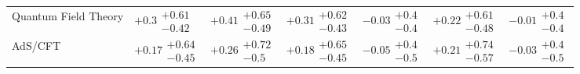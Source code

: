 \begin{table}[H]
\begin{tabular}{lllllll}
Quantum Field Theory                      &        $+0.3\substack{+0.61 \\ -0.42}$ &       $+0.41\substack{+0.65 \\ -0.49}$ &       $+0.31\substack{+0.62 \\ -0.43}$ &         $-0.03\substack{+0.4 \\ -0.4}$ &       $+0.22\substack{+0.61 \\ -0.48}$ &         $-0.01\substack{+0.4 \\ -0.4}$ \\
AdS/CFT                                   &       $+0.17\substack{+0.64 \\ -0.45}$ &        $+0.26\substack{+0.72 \\ -0.5}$ &       $+0.18\substack{+0.65 \\ -0.45}$ &         $-0.05\substack{+0.4 \\ -0.5}$ &       $+0.21\substack{+0.74 \\ -0.57}$ &         $-0.03\substack{+0.4 \\ -0.5}$ \\
\bottomrule
\end{tabular}
\end{table}
